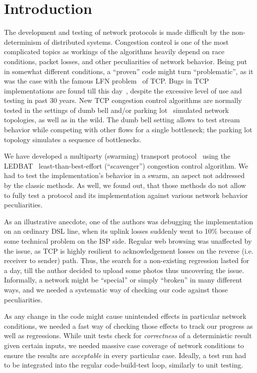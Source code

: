 \documentclass[conference]{IEEEtran}
\begin{document}
\section{Introduction}
The development and testing of network protocols is made difficult by the non-determinism of distributed systems. Congestion control is one of the most complicated topics as workings of the algorithms heavily depend on race conditions, packet losses, and other peculiarities of network behavior. Being put in somewhat different conditions, a ``proven'' code might turn ``problematic'', as it was the case with the famous LFN problem~\cite{lfn1,lfn2} of TCP. Bugs in TCP implementations are found till this day~\cite{tcp-bug}, despite the excessive level of use and testing in past 30 years.
New TCP congestion control algorithms are normally tested in the settings of dumb bell and/or parking lot~\cite{tcp-eval} simulated network topologies, as well as in the wild. The dumb bell setting allows to test stream behavior while competing with other flows for a single bottleneck; the parking lot topology simulates a sequence of bottlenecks.

We have developed a multiparty (swarming) transport protocol~\cite{swift} using the LEDBAT~\cite{ledbat} least-than-best-effort (``scavenger'') congestion control algorithm. We had to test the implementation's behavior in a swarm, an aspect not addressed by the classic methods.
As well, we found out, that those methods do not allow to fully test a protocol and its implementation against various network behavior peculiarities.

As an illustrative anecdote, one of the authors was debugging the implementation on an ordinary DSL line, when its uplink losses suddenly went to 10\% because of some technical problem on the ISP side. Regular web browsing was unaffected by the issue, as TCP is highly resilient to acknowledgement losses on the reverse (i.e. receiver to sender) path. Thus, the search for a non-existing regression lasted for a day, till the author decided to upload some photos thus uncovering the issue. Informally, a network might be ``special'' or simply ``broken'' in many different ways, and we needed a systematic way of checking our code against those peculiarities.

As any change in the code might cause unintended effects in particular network conditions, we needed a fast way of checking those effects to track our progress as well as regressions.
While unit tests check for \emph{correctness} of a deterministic result given certain inputs, we needed massive case coverage of network conditions to ensure the results are \emph{acceptable} in every particular case.
Ideally, a test run had to be integrated into the regular code-build-test loop, similarly to unit testing.
\end{document}

